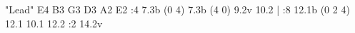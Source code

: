 \track "Lead"  \tuning E4 B3 G3 D3 A2 E2
:4 7.3{b (0 4)} 7.3{b (4 0)} 9.2{v} 10.2 | :8 12.1{b (0 2 4)} 12.1 10.1 12.2 :2 14.2{v}
